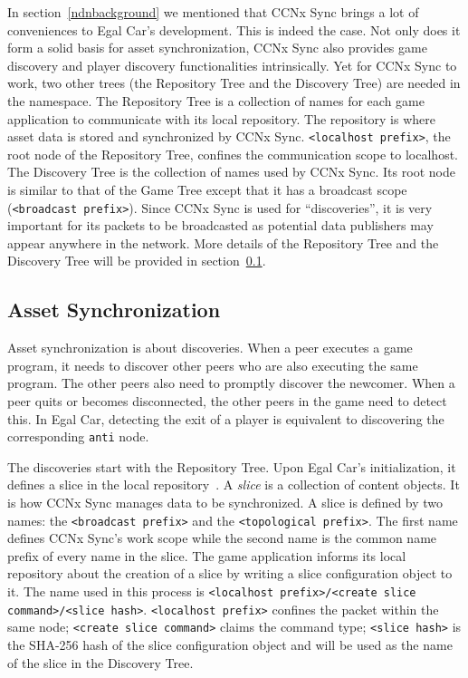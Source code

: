 \documentclass{article}
\begin{document}
In section~\ref{ndnbackground} we mentioned that CCNx Sync brings a lot of conveniences to Egal Car's development. This is indeed the case. Not only does it form a solid basis for asset synchronization, CCNx Sync also provides game discovery and player discovery functionalities intrinsically. Yet for CCNx Sync to work, two other trees (the Repository Tree and the Discovery Tree) are needed in the namespace. The Repository Tree is a collection of names for each game application to communicate with its local repository. The repository is where asset data is stored and synchronized by CCNx Sync. \texttt{<localhost prefix>}, the root node of the Repository Tree, confines the communication scope to localhost. The Discovery Tree is the collection of names used by CCNx Sync. Its root node is similar to that of the Game Tree except that it has a broadcast scope (\texttt{<broadcast prefix>}). Since CCNx Sync is used for ``discoveries'', it is very important for its packets to be broadcasted as potential data publishers may appear anywhere in the network. More details of the Repository Tree and the Discovery Tree will be provided in section~\ref{assetsynchronization}.

\subsection{Asset Synchronization}
\label{assetsynchronization}

Asset synchronization is about discoveries. When a peer executes a game program, it needs to discover other peers who are also executing the same program. The other peers also need to promptly discover the newcomer. When a peer quits or becomes disconnected, the other peers in the game need to detect this. In Egal Car, detecting the exit of a player is equivalent to discovering the corresponding \texttt{anti} node.

The discoveries start with the Repository Tree. Upon Egal Car's initialization, it defines a slice in the local repository~\cite{CCNxCS}. A \emph{slice} is a collection of content objects. It is how CCNx Sync manages data to be synchronized. A slice is defined by two names: the \texttt{<broadcast prefix>} and the \texttt{<topological prefix>}. The first name defines CCNx Sync's work scope while the second name is the common name prefix of every name in the slice. The game application informs its local repository about the creation of a slice by writing a slice configuration object to it. The name used in this process is \texttt{<localhost prefix>/<create slice command>/<slice hash>}. \texttt{<localhost prefix>} confines the packet within the same node; \texttt{<create slice command>} claims the command type; \texttt{<slice hash>} is the SHA-256 hash of the slice configuration object and will be used as the name of the slice in the Discovery Tree.
\end{document}
